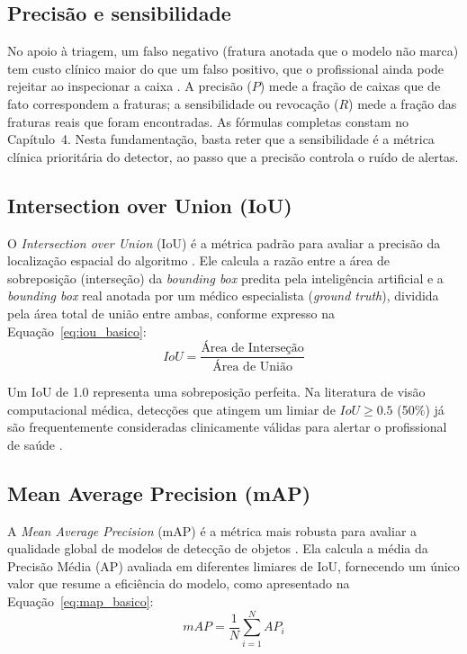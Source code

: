 \documentclass[12pt,oneside,a4paper,chapter=TITLE,section=TITLE,sumario=tradicional]{abntex2}
\begin{document}
\subsection{Precisão e sensibilidade}

No apoio à triagem, um falso negativo (fratura anotada que o modelo não marca) tem custo clínico maior do que um falso positivo, que o profissional ainda pode rejeitar ao inspecionar a caixa \cite{kim2020}. A precisão ($P$) mede a fração de caixas que de fato correspondem a fraturas; a sensibilidade ou revocação ($R$) mede a fração das fraturas reais que foram encontradas. As fórmulas completas constam no Capítulo~4. Nesta fundamentação, basta reter que a sensibilidade é a métrica clínica prioritária do detector, ao passo que a precisão controla o ruído de alertas.

\subsection{Intersection over Union (IoU)}

O \textit{Intersection over Union} (IoU) é a métrica padrão para avaliar a precisão da localização espacial do algoritmo \cite{lin2014coco,litjens2017survey}. Ele calcula a razão entre a área de sobreposição (interseção) da \textit{bounding box} predita pela inteligência artificial e a \textit{bounding box} real anotada por um médico especialista (\textit{ground truth}), dividida pela área total de união entre ambas, conforme expresso na Equação~\eqref{eq:iou_basico}:
\begin{equation}
\label{eq:iou_basico}
IoU = \frac{\text{Área de Interseção}}{\text{Área de União}}
\end{equation}

Um IoU de 1.0 representa uma sobreposição perfeita. Na literatura de visão computacional médica, detecções que atingem um limiar de $IoU \geq 0.5$ (50\%) já são frequentemente consideradas clinicamente válidas para alertar o profissional de saúde \cite{lin2014coco,kim2020}.

\subsection{Mean Average Precision (mAP)}

A \textit{Mean Average Precision} (mAP) é a métrica mais robusta para avaliar a qualidade global de modelos de detecção de objetos \cite{lin2014coco}. Ela calcula a média da Precisão Média (AP) avaliada em diferentes limiares de IoU, fornecendo um único valor que resume a eficiência do modelo, como apresentado na Equação~\eqref{eq:map_basico}:
\begin{equation}
\label{eq:map_basico}
mAP = \frac{1}{N} \sum_{i=1}^{N} AP_i
\end{equation}
\end{document}
